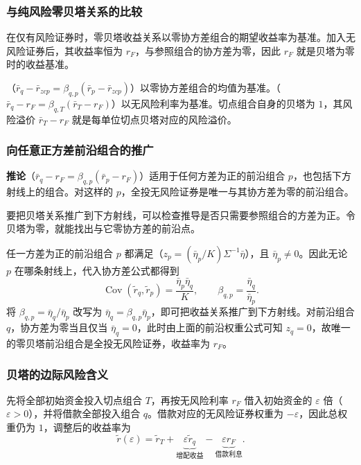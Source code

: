 \subsubsection*{与纯风险零贝塔关系的比较}
在仅有风险证券时，零贝塔收益关系以零协方差组合的期望收益率为基准。加入无风险证券后，其收益率恒为 $r_F$，与参照组合的协方差为零，因此 $r_F$ 就是贝塔为零时的收益基准。

（$\bar r_q-\bar r_{zcp}=\beta_{q,p}(\bar r_p-\bar r_{zcp})$）以零协方差组合的均值为基准。（$\bar r_q-r_F=\beta_{q,T}(\bar r_T-r_F)$）以无风险利率为基准。切点组合自身的贝塔为 $1$，其风险溢价 $\bar r_T-r_F$ 就是每单位切点贝塔对应的风险溢价。

\subsubsection*{向任意正方差前沿组合的推广}
\begin{tcolorbox}[knowledge]
\textbf{推论}\quad {}（$\bar r_q-r_F=\beta_{q,p}(\bar r_p-r_F)$）适用于任何方差为正的前沿组合 $p$，也包括下方射线上的组合。对这样的 $p$，全投无风险证券是唯一与其协方差为零的前沿组合。
\end{tcolorbox}

要把贝塔关系推广到下方射线，可以检查推导是否只需要参照组合的方差为正。令贝塔为零，就能找出与它零协方差的前沿点。

\begin{solution}[label-content={证明},blank-type=none]
任一方差为正的前沿组合 $p$ 都满足（$z_p=(\bar\eta_p/K)\Sigma^{-1}\bar\eta$），且 $\bar\eta_p\ne0$。因此无论 $p$ 在哪条射线上，代入协方差公式都得到
\[
 \operatorname{Cov}(\widetilde r_q,\widetilde r_p)
 =\frac{\bar\eta_p\bar\eta_q}{K},\qquad
 \beta_{q,p}=\frac{\bar\eta_q}{\bar\eta_p}.
\]
将 $\beta_{q,p}=\bar\eta_q/\bar\eta_p$ 改写为 $\bar\eta_q=\beta_{q,p}\bar\eta_p$，即可把收益关系推广到下方射线。对前沿组合 $q$，协方差为零当且仅当 $\bar\eta_q=0$，此时由上面的前沿权重公式可知 $z_q=0$，故唯一的零贝塔前沿组合是全投无风险证券，收益率为 $r_F$。
\end{solution}

\subsubsection*{贝塔的边际风险含义}
先将全部初始资金投入切点组合 $T$，再按无风险利率 $r_F$ 借入初始资金的 $\varepsilon$ 倍（$\varepsilon>0$），并将借款全部投入组合 $q$。借款对应的无风险证券权重为 $-\varepsilon$，因此总权重仍为 $1$，调整后的收益率为
\[
 \widetilde r(\varepsilon)=\widetilde r_T
 +\underbrace{\varepsilon\widetilde r_q}_{\text{增配收益}}
 -\underbrace{\varepsilon r_F}_{\text{借款利息}}.
\]

